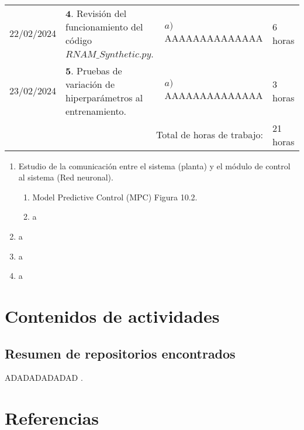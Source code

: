 \documentclass[12pt]{article}
\begin{document}
\hfill\\
\begin{minipage}[h]{\textwidth}
	\centering
	\begin{tabularx}{\textwidth}{|p{2cm}|X|X|p{2cm}|} 
		\hline		
		
	 	22/02/2024 & 
	 	$\mathbf{4}.$ Revisión del funcionamiento del código $RNAM\_ Synthetic.py$. & 
	 	$a)$ AAAAAAAAAAAAAA \newline  & 
	 	6 horas \\
	 	23/02/2024 & 
	 	$\mathbf{5}.$ Pruebas de variación de hiperparámetros al entrenamiento. & 
	 	$a)$ AAAAAAAAAAAAAA \newline  & 
	 	3 horas \\
	 	\hline
		\multicolumn{3}{|r|}{Total de horas de trabajo:} & 21 horas \\ 
	 	\hline                 
	\end{tabularx}
\end{minipage}


\begin{enumerate}
	\item Estudio de la comunicación entre el sistema (planta) y el módulo de control al sistema (Red neuronal).
	\begin{enumerate}
		\item Model Predictive Control (MPC) \cite{DataScience} Figura 10.2.
		\item a
	\end{enumerate}
	\item a
	\item a
	\item a
\end{enumerate}


\newpage

\section*{Contenidos de actividades}

\subsection*{Resumen de repositorios encontrados}

ADADADADADAD \cite{DataScience}.






\newpage

\section*{Referencias}
\renewcommand\refname{}


\end{document}
